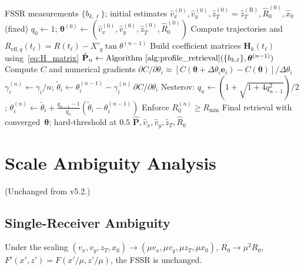 \documentclass[11pt,a4paper]{article}
\begin{document}
\begin{algorithm}[H]
\caption{Joint shadow profile and motion parameter estimation}
\label{alg:joint_estimation}
\begin{algorithmic}[1]
\Require FSSR measurements $\{b_{k,\ell}\}$; initial estimates
$\hat{v}_x^{(0)},\hat{v}_y^{(0)},
\hat{z}_T^{(0)}=\hat{z}_T^{(\mathrm{B})},\hat{R}_0^{(0)},
\hat{x}_0$ (fixed)
\State $q_0\leftarrow 1$;
$\bm{\theta}^{(0)}\leftarrow
(\hat{v}_x^{(0)},\hat{v}_y^{(0)},\hat{z}_T^{(0)},\hat{R}_0^{(0)})$
  \State Compute trajectories and
    $R_{\mathrm{eff},q}(t_\ell)=R(t_\ell)-X'_q\tan\theta^{(n-1)}$
  \State Build coefficient matrices
    $\mathbf{H}_k(t_\ell)$ using~\eqref{eq:H_matrix}
  \State $\hat{\mathbf{P}}_n \leftarrow
    \text{Algorithm~\ref{alg:profile_retrieval}}
    (\{b_{k,\ell}\},\bm{\theta}^{(n-1)})$
  \State Compute $C$ and numerical gradients
    $\partial C/\partial\theta_i\approx
    [C(\bm{\theta}{+}\Delta\theta_i\mathbf{e}_i)-C(\bm{\theta})]
    /\Delta\theta_i$
  \State $\gamma_i^{(n)}\leftarrow\gamma_i/n$;\quad
    $\tilde{\theta}_i \leftarrow \theta_i^{(n-1)}
    - \gamma_i^{(n)}\,\partial C/\partial\theta_i$
  \State Nesterov:
    $q_n\leftarrow(1{+}\sqrt{1{+}4q_{n-1}^2})/2$;\quad
    $\theta_i^{(n)}\leftarrow\tilde{\theta}_i
    +\tfrac{q_{n-1}-1}{q_n}(\tilde{\theta}_i{-}\theta_i^{(n-1)})$
  \State Enforce $R_0^{(n)}\ge R_{\min}$
\EndFor
\State Final retrieval with converged~$\bm{\theta}$; hard-threshold at
$0.5$
\State \Return
  $\hat{\mathbf{P}},\hat{v}_x,\hat{v}_y,\hat{z}_T,\hat{R}_0$
\end{algorithmic}
\end{algorithm}

\section{Scale Ambiguity Analysis}
\label{sec:ambiguity}

(Unchanged from v5.2.)

\subsection{Single-Receiver Ambiguity}
Under the scaling
$(v_x,v_y,z_T,x_0)\to(\mu v_x,\mu v_y,\mu z_T,\mu x_0)$,
$R_0\to\mu^2 R_0$,
$F'(x',z')=F(x'/\mu,z'/\mu)$,
the FSSR is unchanged.
\end{document}
